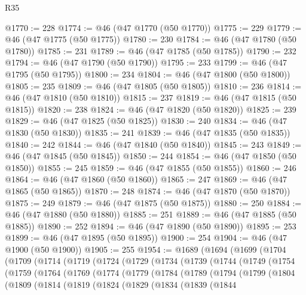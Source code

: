 \begin{lexlean}{R35}
\begin{coremodule}
@1770 := 228
@1774 := @46 (@47 @1770 (@50 @1770))
@1775 := 229
@1779 := @46 (@47 @1775 (@50 @1775))
@1780 := 230
@1784 := @46 (@47 @1780 (@50 @1780))
@1785 := 231
@1789 := @46 (@47 @1785 (@50 @1785))
@1790 := 232
@1794 := @46 (@47 @1790 (@50 @1790))
@1795 := 233
@1799 := @46 (@47 @1795 (@50 @1795))
@1800 := 234
@1804 := @46 (@47 @1800 (@50 @1800))
@1805 := 235
@1809 := @46 (@47 @1805 (@50 @1805))
@1810 := 236
@1814 := @46 (@47 @1810 (@50 @1810))
@1815 := 237
@1819 := @46 (@47 @1815 (@50 @1815))
@1820 := 238
@1824 := @46 (@47 @1820 (@50 @1820))
@1825 := 239
@1829 := @46 (@47 @1825 (@50 @1825))
@1830 := 240
@1834 := @46 (@47 @1830 (@50 @1830))
@1835 := 241
@1839 := @46 (@47 @1835 (@50 @1835))
@1840 := 242
@1844 := @46 (@47 @1840 (@50 @1840))
@1845 := 243
@1849 := @46 (@47 @1845 (@50 @1845))
@1850 := 244
@1854 := @46 (@47 @1850 (@50 @1850))
@1855 := 245
@1859 := @46 (@47 @1855 (@50 @1855))
@1860 := 246
@1864 := @46 (@47 @1860 (@50 @1860))
@1865 := 247
@1869 := @46 (@47 @1865 (@50 @1865))
@1870 := 248
@1874 := @46 (@47 @1870 (@50 @1870))
@1875 := 249
@1879 := @46 (@47 @1875 (@50 @1875))
@1880 := 250
@1884 := @46 (@47 @1880 (@50 @1880))
@1885 := 251
@1889 := @46 (@47 @1885 (@50 @1885))
@1890 := 252
@1894 := @46 (@47 @1890 (@50 @1890))
@1895 := 253
@1899 := @46 (@47 @1895 (@50 @1895))
@1900 := 254
@1904 := @46 (@47 @1900 (@50 @1900))
@1905 := 255
@1954 := @1689
    (@1694
      (@1699
        (@1704
          (@1709
            (@1714
              (@1719
                (@1724
                  (@1729
                    (@1734
                      (@1739
                        (@1744
                          (@1749
                            (@1754
                              (@1759
                                (@1764
                                  (@1769
                                    (@1774
                                      (@1779
                                        (@1784
                                          (@1789
                                            (@1794
                                              (@1799
                                                (@1804
                                                  (@1809
                                                    (@1814
                                                      (@1819
                                                        (@1824
                                                          (@1829
                                                            (@1834
                                                              (@1839
                                                                (@1844

\end{coremodule}
\end{lexlean}
